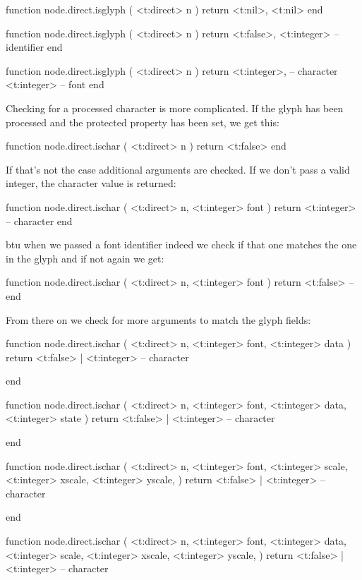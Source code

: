 \starttyping[option=LUA]
function node.direct.isglyph ( <t:direct> n )
    return
        <t:nil>,
        <t:nil>
end

function node.direct.isglyph ( <t:direct> n )
    return
        <t:false>,
        <t:integer> -- identifier
end

function node.direct.isglyph ( <t:direct> n )
    return
        <t:integer>, -- character
        <t:integer>  -- font
end
\stoptyping

Checking for a processed character is more complicated. If the glyph has been processed and
the protected property has been set, we get this:

\starttyping[option=LUA]
function node.direct.ischar ( <t:direct> n )
    return <t:false>
end
\stoptyping

If that's not the case additional arguments are checked. If we don't pass a valid
integer, the character value is returned:

\starttyping[option=LUA]
function node.direct.ischar ( <t:direct> n, <t:integer> font )
    return <t:integer> -- character
end
\stoptyping

btu when we passed a font identifier indeed we check if that one matches the one in the
glyph and if not again we get:

\starttyping[option=LUA]
function node.direct.ischar ( <t:direct> n, <t:integer> font )
    return <t:false> --
end
\stoptyping

From there on we check for more arguments to match the glyph fields:

\starttyping[option=LUA]
function node.direct.ischar (
    <t:direct>  n,
    <t:integer> font,
    <t:integer> data
)
    return <t:false> | <t:integer> -- character

end

function node.direct.ischar (
    <t:direct>  n,
    <t:integer> font,
    <t:integer> data,
    <t:integer> state
)
    return <t:false> | <t:integer> -- character

end

function node.direct.ischar (
    <t:direct>  n,
    <t:integer> font,
    <t:integer> scale,
    <t:integer> xscale,
    <t:integer> yscale,
)
    return <t:false> | <t:integer> -- character

end

function node.direct.ischar (
    <t:direct>  n,
    <t:integer> font,
    <t:integer> data,
    <t:integer> scale,
    <t:integer> xscale,
    <t:integer> yscale,
)
    return <t:false> | <t:integer> -- character

